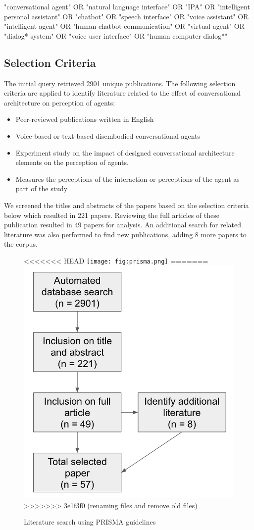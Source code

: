 \documentclass[sigconf,screen,review, anonymous]{acmart}
\begin{document}
\begin{mdframed}
"conversational agent" OR "natural language interface" OR "IPA" OR "intelligent personal assistant" OR "chatbot" OR "speech interface" OR "voice assistant" OR "intelligent agent" OR "human-chatbot communication" OR "virtual agent" OR "dialog* system" OR "voice user interface" OR "human computer dialog*"
\end{mdframed}

\subsection{Selection Criteria}
The initial query retrieved 2901 unique publications. The following selection criteria are applied to identify literature related to the effect of conversational architecture on perception of agents:
\begin{itemize}
  \item Peer-reviewed publications written in English
  \item Voice-based or text-based disembodied conversational agents
  \item Experiment study on the impact of designed conversational architecture elements on the perception of agents.
  \item Measures the perceptions of the interaction or perceptions of the agent as part of the study
\end{itemize}

We screened the titles and abstracts of the papers based on the selection criteria below which resulted in 221 papers. Reviewing the full articles of these publication resulted in 49 papers for analysis. An additional search for related literature was also performed to find new publications, adding 8 more papers to the corpus.

\begin{figure}[h]
  \centering
<<<<<<< HEAD
  \texttt{[image: fig:prisma.png]}
=======
  \includegraphics[width=0.6\columnwidth]{fig-prisma.png}
>>>>>>> 3e1f3f0 (renaming files and remove old files)
  \caption{Literature search using PRISMA guidelines}
  \label{fig:prisma}
\end{figure}
\end{document}
